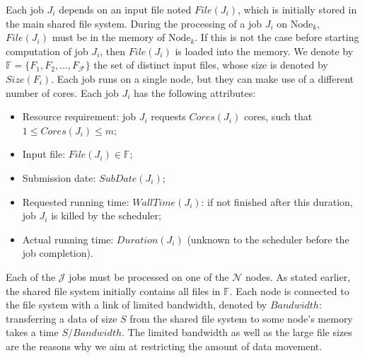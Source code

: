 \documentclass[conference]{IEEEtran}
\newcommand{\Node}[1]{\ensuremath{\mathrm{Node}_{#1}}\xspace}
\newcommand{\file}{\ensuremath{\mathit{File}}\xspace}
\newcommand{\size}{\ensuremath{\mathit{Size}}\xspace}
\newcommand{\duration}{\mathit{Duration}\xspace}
\newcommand{\bandwidth}{\mathit{Bandwidth}\xspace}
\newcommand{\core}{\mathit{Cores}\xspace}
\newcommand{\submissiontime}{\mathit{SubDate}\xspace}
\newcommand{\walltime}{\mathit{WallTime}\xspace}
\newcommand{\fileset}{\ensuremath{\mathbb{F}}\xspace}
\newcommand{\filenum}{\ensuremath{\mathcal{F}}\xspace}
\newcommand{\jobnum}{\ensuremath{\mathcal{J}}\xspace}
\newcommand{\nodenum}{\ensuremath{\mathcal{N}}\xspace}
\begin{document}
Each job $J_i$ depends on an input file noted $\file(J_i)$, which is
initially stored in the main shared file system.  During the
processing of a job $J_i$ on $\Node{k}$, $\file(J_i)$ must be in
the memory of $\Node{k}$. If this is not the case before starting
computation of job $J_i$, then $\file(J_i)$ is loaded into the
memory.  We denote by $\fileset = \{F_1, F_2, \ldots, F_\filenum\}$ the set
of distinct input files, whose size is denoted by $\size(F_i)$. Each
job runs on a single node, but they can make use of a different number
of cores.
Each job $J_i$ has the following attributes:
\begin{itemize}
\item Resource requirement: job $J_i$ requests $\core(J_i)$  cores, such that $1 \leq \core(J_i) \leq m$;
\item Input file: $\file(J_i) \in \fileset$;
\item Submission date: $\submissiontime(J_i)$;
\item Requested running time: $\walltime(J_i)$: if not
  finished after this duration, job $J_i$ is killed by the scheduler;
\item Actual running time: $\duration(J_i)$ (unknown to  the scheduler
  before the job completion).
\end{itemize}

Each of the $\jobnum$ jobs must be processed on one of the $\nodenum$ nodes.  As
stated earlier, the shared file system initially contains all files
in $\fileset$.  Each node is connected to the file system with a link
of limited bandwidth, denoted by $\bandwidth$: transferring a data of
size $S$ from the shared file system to some node's memory takes a
time $S/\bandwidth$.
The limited bandwidth
as well as the large file sizes are the reasons why we aim at
restricting the amount of data movement.
\end{document}
